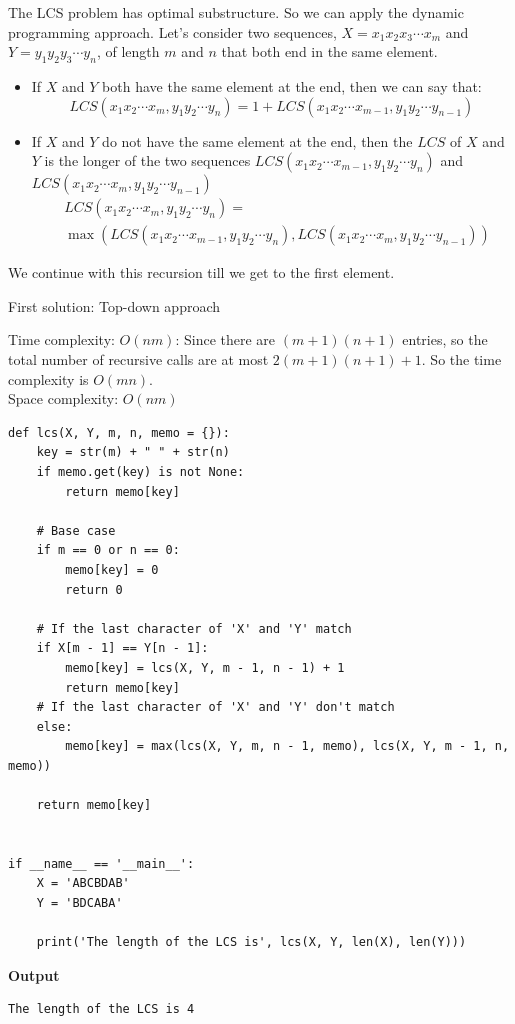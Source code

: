 \documentclass[a4paper,11pt]{book}
\begin{document}
\noindent The LCS problem has optimal substructure. So we can apply the dynamic programming approach. Let's consider two sequences, $X = x_1x_2x_3\cdots x_m$ and $Y=y_1y_2y_3\cdots y_n$, of length $m$ and $n$ that both end in the same element.

\begin{itemize}
    \item If $X$ and $Y$ both have the same element at the end, then we can say that:
    $$LCS(x_1x_2\cdots x_m, y_1y_2\cdots y_n) = 1 + LCS(x_1x_2\cdots x_{m-1}, y_1y_2\cdots y_{n-1})$$
    \item If $X$ and $Y$ do not have the same element at the end, then the $LCS$ of $X$ and $Y$ is the longer of the two sequences $LCS(x_1x_2\cdots x_{m-1}, y_1y_2\cdots y_n)$ and $LCS(x_1x_2\cdots x_m, y_1y_2\cdots y_{n-1})$
    \begin{align*}
        &LCS(x_1x_2\cdots x_m, y_1y_2\cdots y_n) =\\
        &\max(LCS(x_1x_2\cdots x_{m-1}, y_1y_2\cdots y_n), LCS(x_1x_2\cdots x_m, y_1y_2\cdots y_{n-1}))
    \end{align*}
\end{itemize}

\noindent We continue with this recursion till we get to the first element.
\vspace{3mm}

\noindent First solution: Top-down approach

\noindent Time complexity: $O(nm)$: Since there are $(m+1)(n+1)$ entries, so the total number of recursive calls are at most $2(m+1)(n+1)+1$. So the time complexity is $O(mn)$.\\
\noindent  Space complexity: $O(nm)$

\begin{lstlisting}
def lcs(X, Y, m, n, memo = {}):
    key = str(m) + " " + str(n)
    if memo.get(key) is not None:
        return memo[key]

    # Base case
    if m == 0 or n == 0:
        memo[key] = 0
        return 0
 
    # If the last character of 'X' and 'Y' match
    if X[m - 1] == Y[n - 1]:
        memo[key] = lcs(X, Y, m - 1, n - 1) + 1
        return memo[key]
    # If the last character of 'X' and 'Y' don't match
    else:
        memo[key] = max(lcs(X, Y, m, n - 1, memo), lcs(X, Y, m - 1, n, memo))
    
    return memo[key]
 
 
if __name__ == '__main__':
    X = 'ABCBDAB'
    Y = 'BDCABA'
 
    print('The length of the LCS is', lcs(X, Y, len(X), len(Y)))
\end{lstlisting}
\textbf{Output}
\begin{lstlisting}
The length of the LCS is 4
\end{lstlisting}
\end{document}
